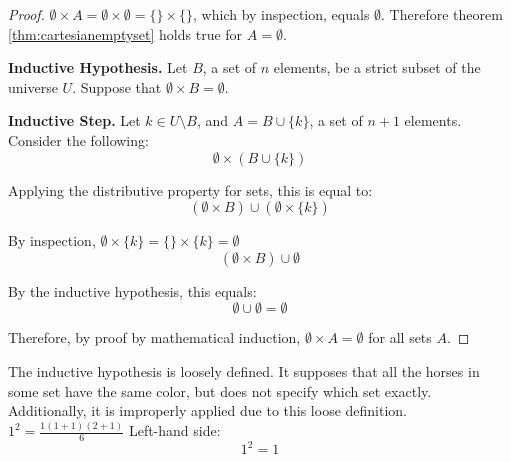 \documentclass{article}
\numberwithin{subcase}{case}
\begin{document}
\begin{outline}[enumerate]
\begin{proof}
        $\emptyset \times A = \emptyset \times \emptyset = \{\} \times \{\}$, which by inspection, equals $\emptyset$.
        Therefore theorem \ref{thm:cartesianemptyset} holds true for $A = \emptyset$.

        \textbf{Inductive Hypothesis.} Let $B$, a set of $n$ elements, be a strict subset of the universe $U$.
        Suppose that $\emptyset \times B = \emptyset$.

        \textbf{Inductive Step.} Let $k \in U \setminus B$, and $A = B \cup \{k\}$, a set of $n+1$ elements. 
        Consider the following:
        \begin{equation}
            \emptyset \times ( B \cup \{ k\} ) 
        \end{equation}

        Applying the distributive property for sets, this is equal to:
        \begin{equation}
            (\emptyset \times B) \cup (\emptyset \times \{ k \} )
        \end{equation}
    
        By inspection, $\emptyset \times \{ k \} = \{\} \times \{ k \} = \emptyset$
        \begin{equation}
            (\emptyset \times B) \cup \emptyset
        \end{equation}

        By the inductive hypothesis, this equals:
        \begin{equation}
            \emptyset \cup \emptyset = \emptyset  
        \end{equation}

        Therefore, by proof by mathematical induction, $\emptyset \times A = \emptyset$
        for all sets $A$.
    \end{proof}

    \1 The inductive hypothesis is loosely defined. It supposes that all the horses in some set 
    have the same color, but does not specify which set exactly. Additionally, it is improperly 
    applied due to this loose definition. 
    \1 
        \2 $1^2 = \frac{1(1 + 1)(2 + 1)}{6}$
        \2 Left-hand side:
        \begin{equation}
            1^2 = 1
        \end{equation}


\end{outline}
\end{document}
